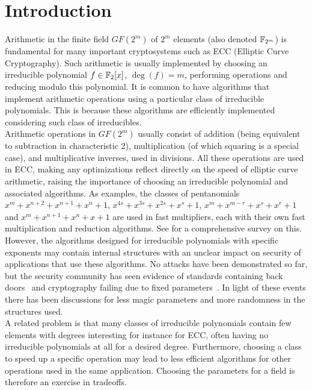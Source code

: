 \section{Introduction}

Arithmetic in the finite field $GF(2^m)$ of $2^m$ elements (also denoted $\mathbb{F}_{2^m}$) is fundamental for many important cryptosystems such as ECC (Elliptic Curve Cryptography). Such arithmetic is usually implemented by choosing an irreducible polynomial $f \in \mathbb{F}_2[x]$, $\deg(f) = m$, performing operations and reducing modulo this polynomial. It is common to have algorithms that implement arithmetic operations using a particular class of irreducible polynomials. This is because these algorithms are efficiently implemented considering such class of irreducibles.\\

Arithmetic operations in $GF(2^m)$ usually consist of addition (being equivalent to subtraction in characteristic 2), multiplication (of which squaring is a special case), and multiplicative inverses, used in divisions. All these operations are used in ECC, making any optimizations reflect directly on the speed of elliptic curve arithmetic, raising the importance of choosing an irreducible polynomial and associated algorithms. As examples, the classes of pentanomials $x^m+x^{n+2}+x^{n+1}+x^{n}+1$, $x^{4s}+x^{3s}+x^{2s}+x^s+1$, $x^m+x^{m-r}+x^s+x^r+1$ and $x^m+x^{n+1}+x^n+x+1$ are used in fast multipliers, each with their own fast multiplication and reduction algorithms. See \cite{fan2015survey} for a comprehensive survey on this.\\

However, the algorithms designed for irreducible polynomials with specific exponents may contain internal structures with an unclear impact on security of applications that use these algorithms. No attacks have been demonstrated so far, but the security community has seen evidence of standards containing back doors~\cite{bernstein2016dual} and cryptography failing due to fixed parameters~\cite{adrian2015imperfect}. In light of these events there has been discussions for less magic parameters and more randomness in the structures used.\\

A related problem is that many classes of irreducible polynomials contain few elements with degrees interesting for instance for ECC, often having no irreducible polynomials at all for a desired degree. Furthermore, choosing a class to speed up a specific operation may lead to less efficient algorithms for other operations used in the same application. Choosing the parameters for a field is therefore an exercise in tradeoffs. \\

